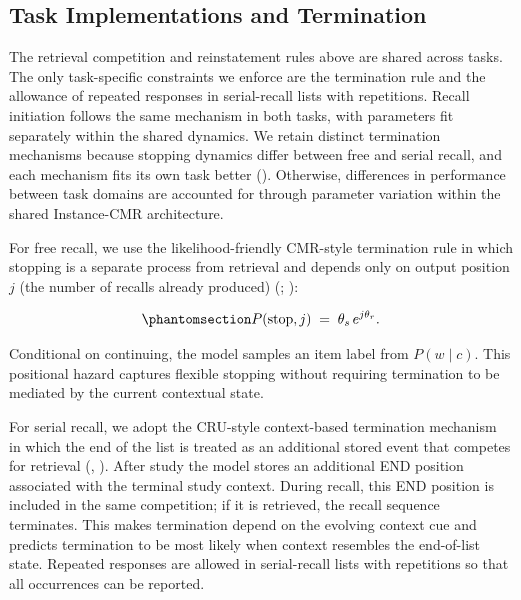 \documentclass[
  man,
  floatsintext,
  longtable,
  nolmodern,
  notxfonts,
  notimes,
  draftfirst,
  colorlinks=true,linkcolor=blue,citecolor=blue,urlcolor=blue]{apa7}
\begin{document}
\subsection{Task Implementations and
Termination}\label{task-implementations-and-termination}

The retrieval competition and reinstatement rules above are shared
across tasks. The only task-specific constraints we enforce are the
termination rule and the allowance of repeated responses in
serial-recall lists with repetitions. Recall initiation follows the same
mechanism in both tasks, with parameters fit separately within the
shared dynamics. We retain distinct termination mechanisms because
stopping dynamics differ between free and serial recall, and each
mechanism fits its own task better (). Otherwise, differences in performance between task
domains are accounted for through parameter variation within the shared
Instance-CMR architecture.

For free recall, we use the likelihood-friendly CMR-style termination
rule in which stopping is a separate process from retrieval and depends
only on output position \(j\) (the number of recalls already produced)
(;
):

\begin{equation}\phantomsection\label{eq-11}{
P(\text{stop}, j) \;=\; \theta_s\,e^{j\theta_r}.
}\end{equation}

Conditional on continuing, the model samples an item label from
\(P(w \mid c)\). This positional hazard captures flexible stopping
without requiring termination to be mediated by the current contextual
state.

For serial recall, we adopt the CRU-style context-based termination
mechanism in which the end of the list is treated as an additional
stored event that competes for retrieval
(,
). After study the model stores an
additional END position associated with the terminal study context.
During recall, this END position is included in the same competition; if
it is retrieved, the recall sequence terminates. This makes termination
depend on the evolving context cue and predicts termination to be most
likely when context resembles the end-of-list state. Repeated responses
are allowed in serial-recall lists with repetitions so that all
occurrences can be reported.
\end{document}
